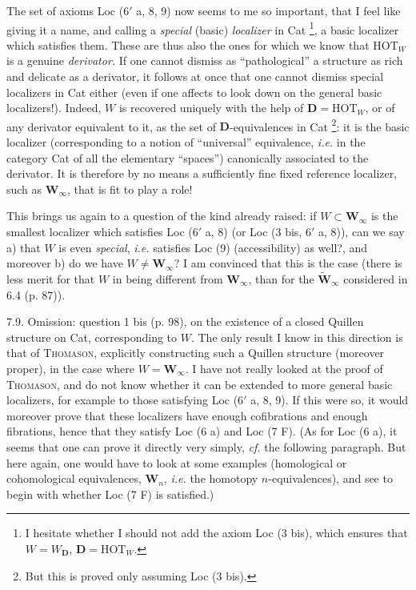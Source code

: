 The set of axioms Loc (6$'$ a, 8, 9) now seems to me so important, that I feel like giving it a name, and calling a \textit{special} (basic) \textit{localizer} in Cat \footnote[57]{I hesitate whether I should not add the axiom Loc (3 bis), which ensures that $W=W_{\mathbf{D}}$, $\mathbf{D}=\mathrm{HOT}_W$.}, a basic localizer which satisfies them. These are thus also the ones for which we know that $\mathrm{HOT}_W$ is a genuine \textit{derivator.} If one cannot dismiss as ``pathological'' a structure as rich and delicate as a derivator, it follows at once that one cannot dismiss special localizers in Cat either (even if one affects to look down on the
general basic localizers!). Indeed, $W$ is recovered uniquely with the help of $\mathbf{D}=\mathrm{HOT}_W$, or of any derivator equivalent to it, as the set of $\mathbf{D}$-equivalences in Cat \footnote[58]{But this is proved only assuming Loc (3 bis).}: it is the basic localizer (corresponding to a notion of ``universal'' equivalence, \textit{i.e.} in the category Cat of all the elementary ``spaces'') canonically associated to the derivator. It is therefore by no means a sufficiently fine fixed reference localizer, such as $\mathbf{W}_\infty$, that is fit to play a role!

This brings us again to a question of the kind already raised: if $W\subset\mathbf{W}_\infty$ is the smallest localizer which satisfies Loc (6$'$ a, 8) (or Loc (3 bis, 6$'$ a, 8)), can we say a) that $W$ is even \textit{special}, \textit{i.e.}
satisfies Loc (9) (accessibility) as well?, and moreover b) do we have $W\neq\mathbf{W}_\infty$? I am convinced that this is the case (there is less merit for that $W$ in being different from $\mathbf{W}_\infty$,
than for the $\tilde{\mathbf{W}}_\infty$ considered in 6.4 (p. 87)).

7.9. Omission: question 1 bis (p. 98), on the existence of a closed Quillen structure on Cat, corresponding to $W$. The only result I know in this direction is that of \textsc{Thomason}, explicitly constructing such a Quillen structure (moreover proper), in the case where $W=\mathbf{W}_\infty$. I have not really looked at the proof of \textsc{Thomason}, and do not know whether it can be extended to more general basic localizers, for example to those satisfying Loc (6$'$ a, 8, 9). If this were so, it would moreover prove that these localizers
have enough cofibrations and enough fibrations, hence that they satisfy Loc (6 a) and Loc (7 F). (As for Loc (6 a), it seems that one can prove it directly very simply, \textit{cf.} the following paragraph. But here again, one would have to look at some examples (homological or cohomological equivalences, $\mathbf{W}_n$, \textit{i.e.} the homotopy $n$-equivalences), and see to begin with whether Loc (7 F) is satisfied.)

